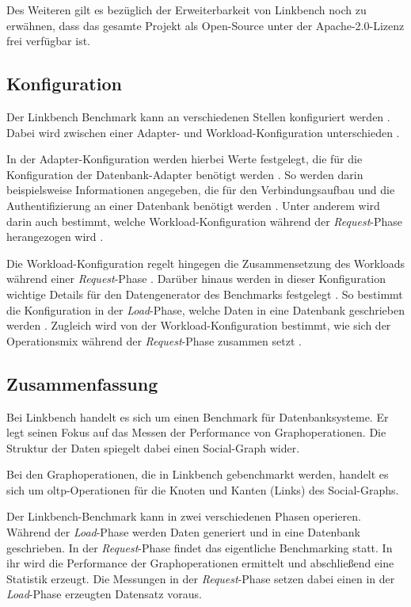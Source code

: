 Des Weiteren gilt es bezüglich der Erweiterbarkeit von Linkbench noch zu erwähnen, dass das gesamte Projekt als Open-Source unter der Apache-2.0-Lizenz frei verfügbar ist.

\subsection{Konfiguration}
Der Linkbench Benchmark kann an verschiedenen Stellen konfiguriert werden \cite{linkbench_paper,fb_linkbench_github}. Dabei wird zwischen einer Adapter- und Workload-Konfiguration unterschieden \cite{fb_linkbench_github}. 

In der Adapter-Konfiguration werden hierbei Werte festgelegt, die für die Konfiguration der Datenbank-Adapter benötigt werden \cite{fb_linkbench_github}. So werden darin beispielsweise Informationen angegeben, die für den Verbindungsaufbau und die Authentifizierung an einer Datenbank benötigt werden \cite{fb_linkbench_github}. Unter anderem wird darin auch bestimmt, welche Workload-Konfiguration während der \textit{Request}-Phase herangezogen wird \cite{fb_linkbench_github}. 

Die Workload-Konfiguration regelt hingegen die Zusammensetzung des Workloads während einer \textit{Request}-Phase \cite{fb_linkbench_github}. Darüber hinaus werden in dieser Konfiguration wichtige Details für den Datengenerator des Benchmarks festgelegt \cite{fb_linkbench_github}. So bestimmt die Konfiguration in der \textit{Load}-Phase, welche Daten in eine Datenbank geschrieben werden \cite{fb_linkbench_github}. Zugleich wird von der Workload-Konfiguration bestimmt, wie sich der Operationsmix während der \textit{Request}-Phase zusammen setzt \cite{fb_linkbench_github}.

\subsection{Zusammenfassung}
Bei Linkbench handelt es sich um einen Benchmark für Datenbanksysteme. Er legt seinen Fokus auf das Messen der Performance von Graphoperationen. Die Struktur der Daten spiegelt dabei einen Social-Graph wider. 

Bei den Graphoperationen, die in Linkbench gebenchmarkt werden, handelt es sich um \acs{oltp}-Operationen für die Knoten und Kanten (Links) des Social-Graphs.

Der Linkbench-Benchmark kann in zwei verschiedenen Phasen operieren. Während der \textit{Load}-Phase werden Daten generiert und in eine Datenbank geschrieben. In der \textit{Request}-Phase findet das eigentliche Benchmarking statt. In ihr wird die Performance der Graphoperationen ermittelt und abschließend eine Statistik erzeugt. Die Messungen in der \textit{Request}-Phase setzen dabei einen in der \textit{Load}-Phase erzeugten Datensatz voraus. 

